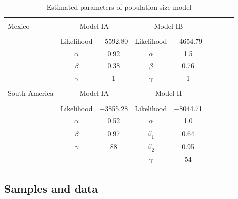 \renewcommand{\arraystretch}{1.1}
\begin{table}[tb]

\begin{center}
 \caption[]{Estimated parameters of population size model}
  \textbf{}\\[-2mm]
{\fontsize{7}{11}\sf
    \begin{tabular}{lcccccccl} \hline
       & & \\[-3mm]
     Mexico  & \multicolumn{2}{c}{Model IA}  &\multicolumn{2}{c}{Model IB}\\[0.1cm]
    \hline
    & & \\[-3mm]
   & Likelihood   & $-$5592.80 & Likelihood       &  $-$4654.79 \\
   &$\alpha$      & 0.92             & $\alpha$        & 1.5 \\
   &$\beta$        & 0.38             & $\beta$          & 0.76\\ 
   &$\gamma$   & 1                   &  $\gamma$   & 1\\ 
      \hline
    & & \\[-3mm]
    South America  & \multicolumn{2}{c}{Model IA}  &\multicolumn{2}{c}{Model II}\\[0.1cm]
        \hline
     & & \\[-3mm]
      & Likelihood   &  $-$3855.28 & Likelihood     &  $-$8044.71 \\
      &$\alpha$      & 0.52              & $\alpha$       & 1.0 \\
      &$\beta$        & 0.97             & $\beta_1$      & 0.64\\ 
      &$\gamma$   & 88                &  $\beta_2$     & 0.95\\ 
      &                    &                     &  $\gamma$    & 54\\ [1mm]
    \hline
    \end{tabular}
    \label{param}  %
}
\end{center}
\end{table}
\renewcommand{\arraystretch}{1}


\subsection*{Samples and data}

